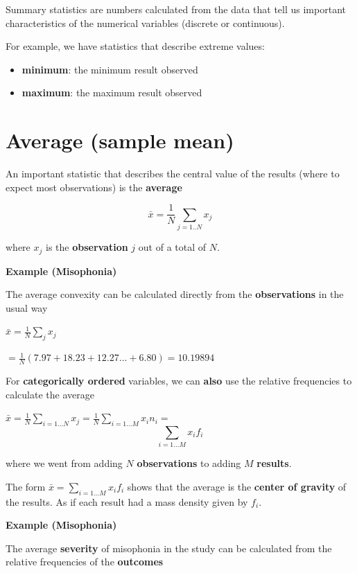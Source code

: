 \documentclass[
]{book}
\providecommand{\tightlist}{%
  \setlength{\itemsep}{0pt}\setlength{\parskip}{0pt}}
\begin{document}
Summary statistics are numbers calculated from the data that tell us important characteristics of the numerical variables (discrete or continuous).

For example, we have statistics that describe extreme values:

\begin{itemize}
\tightlist
\item
  \textbf{minimum}: the minimum result observed
\item
  \textbf{maximum}: the maximum result observed
\end{itemize}

\hypertarget{average-sample-mean}{%
\section{Average (sample mean)}\label{average-sample-mean}}

An important statistic that describes the central value of the results (where to expect most observations) is the \textbf{average}

\[\bar{x}=\frac{1}{N} \sum_{j= 1..N } x_j \]

where \(x_j\) is the \textbf{observation} \(j\) out of a total of \(N\).

\textbf{Example (Misophonia)}

The average convexity can be calculated directly from the \textbf{observations} in the usual way

\(\bar{x}= \frac{1}{ N}\sum_j x_j\)

\(= \frac{1}{ N}( 7.97 + 18.23 + 12.27... + 6.80) = 10.19894\)

For \textbf{categorically ordered} variables, we can \textbf{also} use the relative frequencies to calculate the average

\(\bar{x}=\frac{1}{ N}\sum_{i=1...N} x_j =\frac{1}{N}\sum_{i=1...M} x_i n_ {i}=\)
\[\sum_{i=1...M} x_i f_{i}\]

where we went from adding \(N\) \textbf{observations} to adding \(M\) \textbf{results}.

The form \(\bar{x}= \sum_{i = 1...M} x_i f_i\) shows that the average is the \textbf{center of gravity} of the results. As if each result had a mass density given by \(f_i\).

\textbf{Example (Misophonia)}

The average \textbf{severity} of misophonia in the study can be calculated from the relative frequencies of the \textbf{outcomes}
\end{document}
